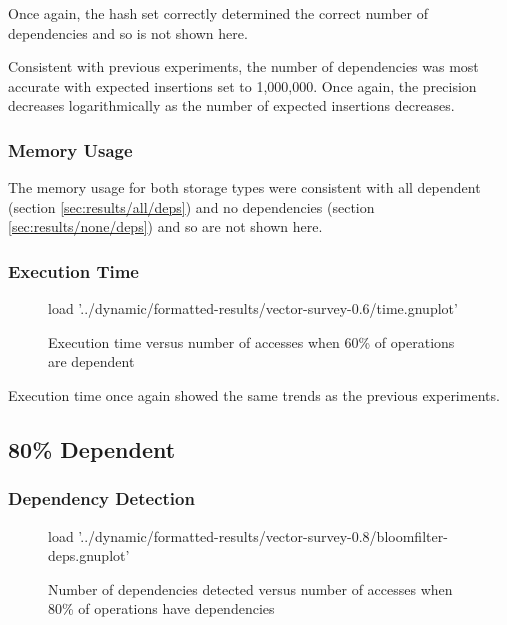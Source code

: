 		Once again, the hash set correctly determined the correct number of dependencies and so is not shown here.
			
		Consistent with previous experiments, the number of dependencies was most accurate with expected insertions set to 1,000,000. Once again, the precision decreases logarithmically as the number of expected insertions decreases.
		
		\subsubsection{Memory Usage} \label{sec:results/60/mem}
		The memory usage for both storage types were consistent with all dependent (section \ref{sec:results/all/deps}) and no dependencies (section \ref{sec:results/none/deps}) and so are not shown here.
		
		\subsubsection{Execution Time} \label{sec:results/60/time}
		\begin{figure}
			\centering
			\begin{gnuplot}[terminal=pdf]
				load '../dynamic/formatted-results/vector-survey-0.6/time.gnuplot'
			\end{gnuplot}
			\caption{Execution time versus number of accesses when 60\% of operations are dependent}
			\label{chart:60-time}
		\end{figure}
		
		Execution time once again showed the same trends as the previous experiments.
		
	\subsection{80\% Dependent} \label{sec:results/80}
	\subsubsection{Dependency Detection} \label{sec:results/80/deps}
		\begin{figure}
			\centering
			\begin{gnuplot}[terminal=pdf]
				load '../dynamic/formatted-results/vector-survey-0.8/bloomfilter-deps.gnuplot'
			\end{gnuplot}
			\caption{Number of dependencies detected versus number of accesses when 80\% of operations have dependencies}
			\label{chart:80-dep}
		\end{figure}
		
